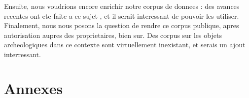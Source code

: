 \documentclass[a4paper, 12pt, titlepage, oneside, french]{article}
\begin{document}
	Ensuite, nous voudrions encore enrichir notre corpus de donnees : des avances recentes ont ete faite a ce sujet \cite{DatasetTranfo}, et il serait interessant de pouvoir les utiliser. Finalement, nous nous posons la question de rendre ce corpus publique, apres autorisation aupres des proprietaires, bien sur. Des corpus sur les objets archeologiques dans ce contexte sont virtuellement inexistant, et serais un ajout interressant. 
\newpage
\section{Annexes}

\medskip
\newpage
\printbibliography
\end{document}
